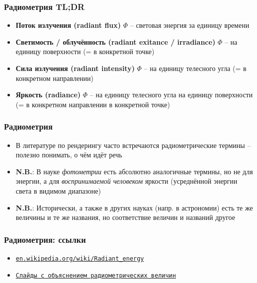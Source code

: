 \documentclass[10pt]{beamer}
\begin{document}
\begin{frame}
\frametitle{Радиометрия TL;DR}
\begin{itemize}
\item \textbf{Поток излучения (radiant flux)} \begin{math}\Phi\end{math} -- световая энергия за единицу времени
\pause
\item \textbf{Светимость / облучённость (radiant exitance / irradiance)} \begin{math}\Phi\end{math} -- на единицу поверхности (= в конкретной точке)
\pause
\item \textbf{Сила излучения (radiant intensity)} \begin{math}\Phi\end{math} -- на единицу телесного угла (= в конкретном направлении)
\pause
\item \textbf{Яркость (radiance)} \begin{math}\Phi\end{math} -- на единицу телесного угла на единицу поверхности (= в конкретном направлении в конкретной точке)
\end{itemize}
\end{frame}

\begin{frame}
\frametitle{Радиометрия}
\begin{itemize}
\item В литературе по рендерингу часто встречаются радиометрические термины -- полезно понимать, о чём идёт речь
\pause
\item \textbf{\alert{N.B.}}: В науке \textit{фотометрии} есть абсолютно аналогичные термины, но не для энергии, а для \textit{воспринимаемой человеком} яркости (усреднённой энергии света в видимом диапазоне)
\pause
\item \textbf{\alert{N.B.}}: Исторически, а также в других науках (напр. в астрономии) есть те же величины и те же названия, но соответствие величин и названий другое
\end{itemize}
\end{frame}

\begin{frame}
\frametitle{Радиометрия: ссылки}
\begin{itemize}
\item \href{https://en.wikipedia.org/wiki/Radiant_energy}{\texttt{en.wikipedia.org/wiki/Radiant\_energy}}
\item \href{https://www.cs.toronto.edu/~kyros/courses/418/Lectures/lecture.2010f.10.pdf}{\texttt{Слайды с объяснением радиометрических величин}}
\end{itemize}
\end{frame}
\end{document}
